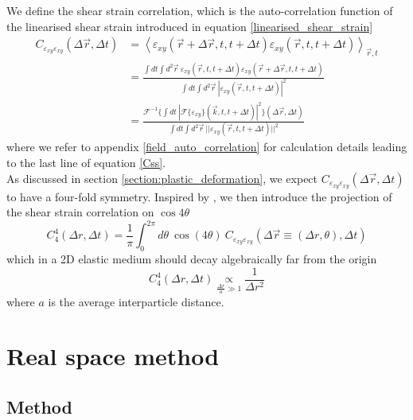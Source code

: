 \documentclass[class=report, float=false, crop=false]{standalone}
\begin{document}
We define the shear strain correlation, which is the auto-correlation function of the linearised shear strain introduced in equation \ref{linearised_shear_strain}
\begin{equation}
\begin{aligned}
C_{\varepsilon_{xy}\varepsilon_{xy}}(\Delta \vec{r}, \Delta t) &= \left<\varepsilon_{xy}(\vec{r}+\Delta\vec{r}, t, t + \Delta t)\varepsilon_{xy}(\vec{r}, t, t + \Delta t)\right>_{\vec{r}, t}\\
&= \frac{\int dt \int d^2\vec{r}~ \varepsilon_{xy}(\vec{r}, t, t+\Delta t)\varepsilon_{xy}(\vec{r} + \Delta \vec{r}, t, t+\Delta t)}{\int dt \int d^2\vec{r}~ |\varepsilon_{xy}(\vec{r}, t, t+\Delta t)|^2}\\
&= \frac{\mathcal{F}^{-1}\{\int dt~ |\mathcal{F}\{\varepsilon_{xy}\}(\vec{k}, t, t + \Delta t)|^2\}(\Delta \vec{r}, \Delta t)}{\int dt \int d^2\vec{r}~ ||\varepsilon_{xy}(\vec{r}, t, t+\Delta t)||^2}
\end{aligned}
\label{Css}
\end{equation}
where we refer to appendix \ref{field_auto_correlation} for calculation details leading to the last line of equation \ref{Css}.\\

As discussed in section \ref{section:plastic_deformation}, we expect $C_{\varepsilon_{xy}\varepsilon_{xy}}(\Delta \vec{r}, \Delta t)$ to have a four-fold symmetry. Inspired by \cite{illing2016strain}, we then introduce the projection of the shear strain correlation on $\cos4\theta$
\begin{equation}
C_4^4(\Delta r, \Delta t) = \frac{1}{\pi} \int_0^{2\pi} d\theta~ \cos(4\theta)~ C_{\varepsilon_{xy}\varepsilon_{xy}}(\Delta\vec{r}\equiv(\Delta r, \theta), \Delta t)
\label{c44_definition}
\end{equation}
which in a 2D elastic medium should decay algebraically far from the origin
\begin{equation}
C_4^4(\Delta r, \Delta t) \underset{\frac{\Delta r}{a} \gg 1}{\propto} \frac{1}{\Delta r^2}
\end{equation}
where $a$ is the average interparticle distance.

\section{Real space method}

\subsection{Method}
\label{subsection:real_space_method}
\end{document}
